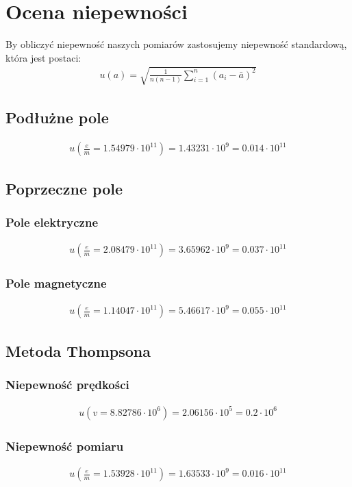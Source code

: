 \documentclass[paper=a4, fontsize=12pt]{scrartcl}
\begin{document}
\section{Ocena niepewności}
By obliczyć niepewność naszych pomiarów zastosujemy niepewność standardową, która jest postaci:
\begin{align}
u(a)=\sqrt{\frac{1}{n(n-1)}\sum\limits_{i=1}^{n}\left(a_i-\bar{a}\right)^2}
\end{align}
\subsection{Podłużne pole}
\begin{align*}
u\left(\frac{e}{m}=1.54979\cdot10^{11}\right)=1.43231\cdot10^9=0.014\cdot10^{11}
\end{align*}
\subsection{Poprzeczne pole}
\subsubsection{Pole elektryczne}
\begin{align*}
u\left(\frac{e}{m}=2.08479\cdot10^{11}\right)=3.65962\cdot10^9=0.037\cdot10^{11}
\end{align*}
\subsubsection{Pole magnetyczne}
\begin{align*}
u\left(\frac{e}{m}=1.14047\cdot10^{11}\right)=5.46617\cdot10^{9}=0.055\cdot10^{11}
\end{align*}
\subsection{Metoda Thompsona}
\subsubsection{Niepewność prędkości}
\begin{align*}
u\left(v=8.82786\cdot10^6\right)=2.06156\cdot10^5=0.2\cdot10^6
\end{align*}
\subsubsection{Niepewność pomiaru}
\begin{align*}
u\left(\frac{e}{m}=1.53928\cdot10^{11}\right)=1.63533\cdot10^9=0.016\cdot10^{11}
\end{align*}
\end{document}
